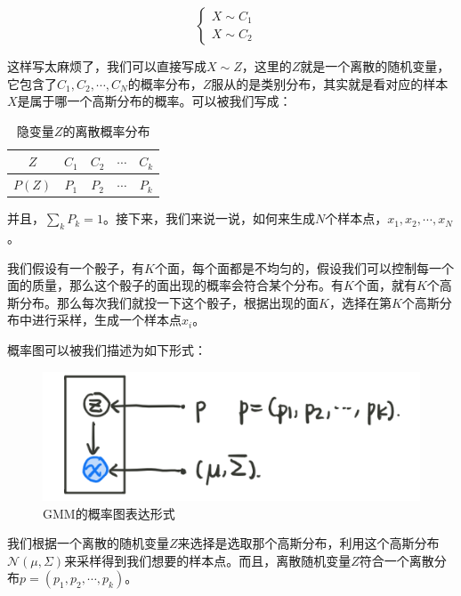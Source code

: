 \documentclass[a4paper]{article}
\begin{document}
\begin{equation}
    \left\{
        \begin{array}{ll}
            X \sim C_1 & \\
            X \sim C_2  
        \end{array}
    \right.
\end{equation}

这样写太麻烦了，我们可以直接写成$X \sim Z$，这里的$Z$就是一个离散的随机变量，它包含了$C_1,C_2,\cdots,C_N$的概率分布，$Z$服从的是类别分布，其实就是看对应的样本$X$是属于哪一个高斯分布的概率。可以被我们写成：
\begin{table}[H]
    \centering
    \begin{tabular}{c|cccc}
         $Z$ & $C_1$ & $C_2$ & $\cdots$ & $C_k$  \\
         \hline
         $P(Z)$ & $P_1$ & $P_2$ & $\cdots$ & $P_k$  \\
    \end{tabular}
    \caption{隐变量$Z$的离散概率分布}
\end{table}

并且，$\sum_k P_k = 1$。接下来，我们来说一说，如何来生成$N$个样本点，$x_1,x_2,\cdots,x_N$。

我们假设有一个骰子，有$K$个面，每个面都是不均匀的，假设我们可以控制每一个面的质量，那么这个骰子的面出现的概率会符合某个分布。有$K$个面，就有$K$个高斯分布。那么每次我们就投一下这个骰子，根据出现的面$K$，选择在第$K$个高斯分布中进行采样，生成一个样本点$x_i$。

概率图可以被我们描述为如下形式：
\begin{figure}[H]
    \centering
    \includegraphics[width=.45\textwidth]{微信图片_20191223234640.png}
    \caption{GMM的概率图表达形式}
    
\end{figure}

我们根据一个离散的随机变量$Z$来选择是选取那个高斯分布，利用这个高斯分布$\mathcal{N}(\mu,\Sigma)$来采样得到我们想要的样本点。而且，离散随机变量$Z$符合一个离散分布$p = (p_1,p_2,\cdots,p_k)$。
\end{document}
